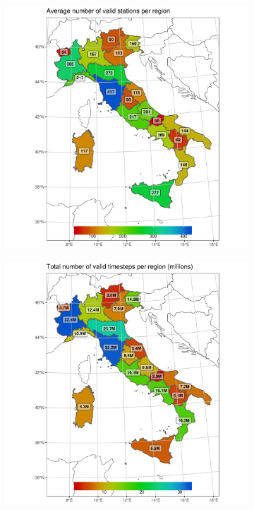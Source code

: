 \begin{figure}
\begin{subfigure}{.475\textwidth}
    \end{subfigure}\\
    \begin{subfigure}{.475\textwidth}
        \caption{}\label{fig:regional_stats/c}
        \includegraphics[width=\textwidth]{figures/rain_dst/regional_stats/plot3.png}
    \end{subfigure}
    \begin{subfigure}{.475\textwidth}
        \caption{}\label{fig:regional_stats/d}
        \includegraphics[width=\textwidth]{figures/rain_dst/regional_stats/plot4.png}

\end{subfigure}
\end{figure}
